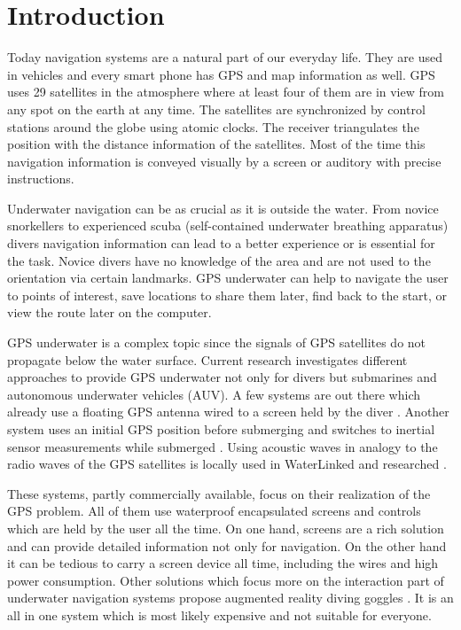 %

\chapter{Introduction}
\label{introduction}

Today navigation systems are a natural part of our everyday life.
They are used in vehicles and every smart phone has GPS and map information as well.
GPS uses 29 satellites in the atmosphere where at least four of them are in view from any spot on the earth at any time.
The satellites are synchronized by control stations around the globe using atomic clocks.
The receiver triangulates the position with the distance information of the satellites.
Most of the time this navigation information is conveyed visually by a screen or auditory with precise instructions.

Underwater navigation can be as crucial as it is outside the water.
From novice snorkellers to experienced scuba (self-contained underwater breathing apparatus) divers navigation information can lead to a better experience or is essential for the task.
Novice divers have no knowledge of the area and are not used to the orientation via certain landmarks.
GPS underwater can help to navigate the user to points of interest, save locations to share them later, find back to the start, or view  the route later on the computer. 

GPS underwater is a complex topic since the signals of GPS satellites do not propagate below the water surface.
Current research investigates different approaches to provide GPS underwater not only for divers but submarines and autonomous underwater vehicles (AUV).
A few systems are out there which already use a floating GPS antenna wired to a screen held by the diver \citep{navdive}.
Another system uses an initial GPS position before submerging and switches to inertial sensor measurements while submerged \citep{ariadna}.
Using acoustic waves in analogy to the radio waves of the GPS satellites is locally used in WaterLinked \citep{waterlinked} and researched \citep{Taraldsen_UnderwaterGPS}.

These systems, partly commercially available, focus on their realization of the GPS problem.
All of them use waterproof encapsulated screens and controls which are held by the user all the time.
On one hand, screens are a rich solution and can provide detailed information not only for navigation.
On the other hand it can be tedious to carry a screen device all time, including the wires and high power consumption.
Other solutions which focus more on the interaction part of underwater navigation systems propose augmented reality diving goggles \citep{scubus}.
It is an all in one system which is most likely expensive and not suitable for everyone.

